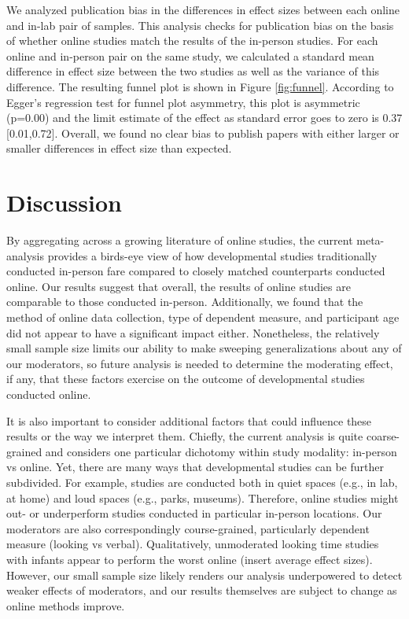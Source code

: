 \documentclass[
  man,floatsintext]{apa6}
\begin{document}
We analyzed publication bias in the differences in effect sizes between each online and in-lab pair of samples. This analysis checks for publication bias on the basis of whether online studies match the results of the in-person studies. For each online and in-person pair on the same study, we calculated a standard mean difference in effect size between the two studies as well as the variance of this difference. The resulting funnel plot is shown in Figure \ref{fig:funnel}. According to Egger's regression test for funnel plot asymmetry, this plot is asymmetric (p=0.00) and the limit estimate of the effect as standard error goes to zero is 0.37 {[}0.01,0.72{]}. Overall, we found no clear bias to publish papers with either larger or smaller differences in effect size than expected.

\hypertarget{discussion}{%
\section{Discussion}\label{discussion}}

By aggregating across a growing literature of online studies, the current meta-analysis provides a birds-eye view of how developmental studies traditionally conducted in-person fare compared to closely matched counterparts conducted online. Our results suggest that overall, the results of online studies are comparable to those conducted in-person. Additionally, we found that the method of online data collection, type of dependent measure, and participant age did not appear to have a significant impact either. Nonetheless, the relatively small sample size limits our ability to make sweeping generalizations about any of our moderators, so future analysis is needed to determine the moderating effect, if any, that these factors exercise on the outcome of developmental studies conducted online.

It is also important to consider additional factors that could influence these results or the way we interpret them. Chiefly, the current analysis is quite coarse-grained and considers one particular dichotomy within study modality: in-person vs online. Yet, there are many ways that developmental studies can be further subdivided. For example, studies are conducted both in quiet spaces (e.g., in lab, at home) and loud spaces (e.g., parks, museums). Therefore, online studies might out- or underperform studies conducted in particular in-person locations. Our moderators are also correspondingly course-grained, particularly dependent measure (looking vs verbal). Qualitatively, unmoderated looking time studies with infants appear to perform the worst online (insert average effect sizes). However, our small sample size likely renders our analysis underpowered to detect weaker effects of moderators, and our results themselves are subject to change as online methods improve.
\end{document}
